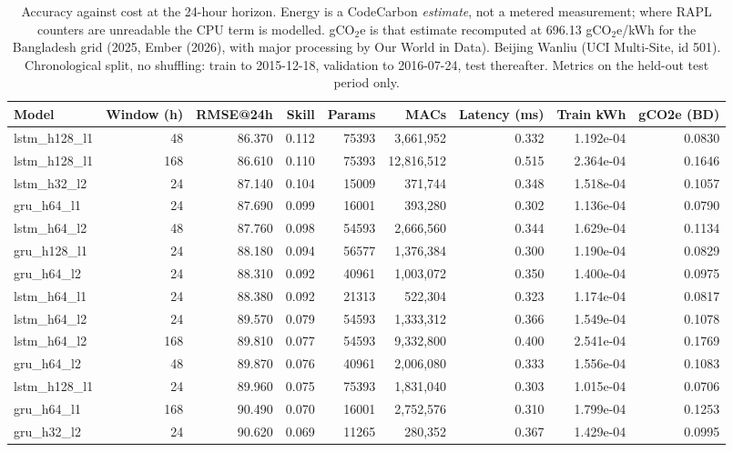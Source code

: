 \begin{table}[htbp]
\caption{Accuracy against cost at the 24-hour horizon. Energy is a CodeCarbon \emph{estimate}, not a metered measurement; where RAPL counters are unreadable the CPU term is modelled. gCO$_2$e is that estimate recomputed at 696.13 gCO$_2$e/kWh for the Bangladesh grid (2025, Ember (2026), with major processing by Our World in Data). Beijing Wanliu (UCI Multi-Site, id 501). Chronological split, no shuffling: train to 2015-12-18, validation to 2016-07-24, test thereafter. Metrics on the held-out test period only.}
\label{tab:green_efficiency}
\begin{tabular}{lrrrrrrrr}
\toprule
Model & Window (h) & RMSE@24h & Skill & Params & MACs & Latency (ms) & Train kWh & gCO2e (BD) \\
\midrule
lstm\_h128\_l1 & 48 & 86.370 & 0.112 & 75393 & 3,661,952 & 0.332 & 1.192e-04 & 0.0830 \\
lstm\_h128\_l1 & 168 & 86.610 & 0.110 & 75393 & 12,816,512 & 0.515 & 2.364e-04 & 0.1646 \\
lstm\_h32\_l2 & 24 & 87.140 & 0.104 & 15009 & 371,744 & 0.348 & 1.518e-04 & 0.1057 \\
gru\_h64\_l1 & 24 & 87.690 & 0.099 & 16001 & 393,280 & 0.302 & 1.136e-04 & 0.0790 \\
lstm\_h64\_l2 & 48 & 87.760 & 0.098 & 54593 & 2,666,560 & 0.344 & 1.629e-04 & 0.1134 \\
gru\_h128\_l1 & 24 & 88.180 & 0.094 & 56577 & 1,376,384 & 0.300 & 1.190e-04 & 0.0829 \\
gru\_h64\_l2 & 24 & 88.310 & 0.092 & 40961 & 1,003,072 & 0.350 & 1.400e-04 & 0.0975 \\
lstm\_h64\_l1 & 24 & 88.380 & 0.092 & 21313 & 522,304 & 0.323 & 1.174e-04 & 0.0817 \\
lstm\_h64\_l2 & 24 & 89.570 & 0.079 & 54593 & 1,333,312 & 0.366 & 1.549e-04 & 0.1078 \\
lstm\_h64\_l2 & 168 & 89.810 & 0.077 & 54593 & 9,332,800 & 0.400 & 2.541e-04 & 0.1769 \\
gru\_h64\_l2 & 48 & 89.870 & 0.076 & 40961 & 2,006,080 & 0.333 & 1.556e-04 & 0.1083 \\
lstm\_h128\_l1 & 24 & 89.960 & 0.075 & 75393 & 1,831,040 & 0.303 & 1.015e-04 & 0.0706 \\
gru\_h64\_l1 & 168 & 90.490 & 0.070 & 16001 & 2,752,576 & 0.310 & 1.799e-04 & 0.1253 \\
gru\_h32\_l2 & 24 & 90.620 & 0.069 & 11265 & 280,352 & 0.367 & 1.429e-04 & 0.0995 \\

\end{tabular}
\end{table}
